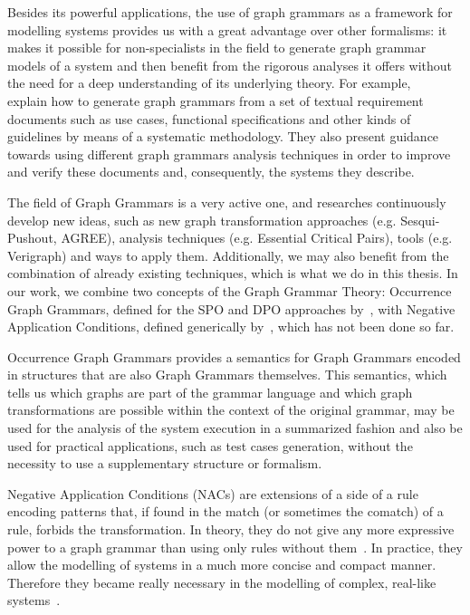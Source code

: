 Besides its powerful applications, the use of graph grammars as a framework for modelling systems provides us with a great advantage over other formalisms: it makes it possible for non-specialists in the field to generate graph grammar models of a system and then benefit from the rigorous analyses it offers without the need for a deep understanding of its underlying theory. For example, ~\cite{Junior2015,BezerraWEIT2016,Cota2017} explain how to generate graph grammars from a set of textual requirement documents such as use cases, functional specifications and other kinds of guidelines by means of a systematic methodology. They also present guidance towards using different graph grammars analysis techniques in order to improve and verify these documents and, consequently, the systems they describe.

The field of Graph Grammars is a very active one, and researches continuously develop new ideas, such as new graph transformation approaches (e.g. Sesqui-Pushout, AGREE), analysis techniques (e.g. Essential Critical Pairs), tools (e.g. Verigraph) and ways to apply them.
Additionally, we may also benefit from the combination of already existing techniques, which is what we do in this thesis.
In our work, we combine two concepts of the Graph Grammar Theory: Occurrence Graph Grammars, defined for the SPO and DPO approaches by~\cite{Ribeiro1996, Corradini1996}, with Negative Application Conditions, defined generically by~\cite{Habel1996}, which has not been done so far.

Occurrence Graph Grammars provides a semantics for Graph Grammars encoded in structures that are also Graph Grammars themselves. 
This semantics, which tells us which graphs are part of the grammar language and which graph transformations are possible within the context of the original grammar, may be used for the analysis of the system execution in a summarized fashion and also be used for practical applications, such as test cases generation, without the necessity to use a supplementary structure or formalism.

Negative Application Conditions (NACs) are extensions of a side of a rule encoding patterns that, if found in the match (or sometimes the comatch) of a rule, forbids the transformation. In theory, they do not give any more expressive power to a graph grammar than using only rules without them~\cite{Habel1996}. In practice, they allow the modelling of systems in a much more concise and compact manner. Therefore they became really necessary in the modelling of complex, real-like systems~\cite{Corradini2013, Corradini2014}.

